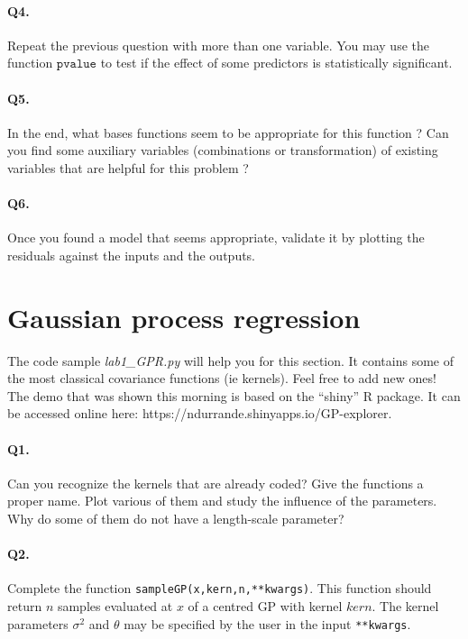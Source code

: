 \documentclass[12pt]{scrartcl}
\begin{document}
\paragraph{Q4.} Repeat the previous question with more than one variable. You may use the function $\texttt{pvalue}$ to test if the effect of some predictors is statistically significant.

\paragraph{Q5.} In the end, what bases functions seem to be appropriate for this function ? Can you find some auxiliary variables (combinations or transformation) of existing variables that are helpful for this problem ?

\paragraph{Q6.} Once you found a model that seems appropriate, validate it by plotting the residuals against the inputs and the outputs.

\section{Gaussian process regression}
The code sample \emph{lab1\_GPR.py} will help you for this section. It contains some of the most classical covariance functions (ie kernels). Feel free to add new ones! The demo that was shown this morning is based on the ``shiny'' R package. It can be accessed online here: https://ndurrande.shinyapps.io/GP-explorer.

\paragraph{Q1.} Can you recognize the kernels that are already coded? Give the functions a proper name. Plot various of them and study the influence of the parameters. Why do some of them do not have a length-scale parameter?

\paragraph{Q2.} Complete the function \texttt{sampleGP(x,kern,n,**kwargs)}. This function should return $n$ samples evaluated at $x$ of a centred GP with kernel $kern$. The kernel parameters $\sigma^2$ and $\theta$ may be specified by the user in the input \texttt{**kwargs}.
\end{document}
